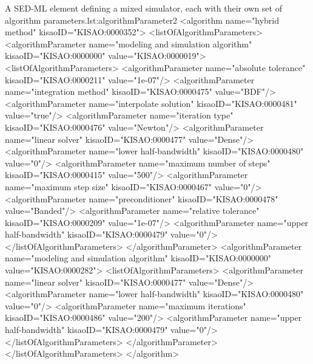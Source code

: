 \begin{myXmlLst}{A SED-ML  element defining a mixed simulator, each with their own set of algorithm parameters.}{lst:algorithmParameter2}
<algorithm name="hybrid method" kisaoID="KISAO:0000352">
    <listOfAlgorithmParameters>
        <algorithmParameter name="modeling and simulation algorithm" kisaoID="KISAO:0000000" value="KISAO:0000019">
            <listOfAlgorithmParameters>
                <algorithmParameter name="absolute tolerance"   kisaoID="KISAO:0000211" value="1e-07"/>
                <algorithmParameter name="integration method"   kisaoID="KISAO:0000475" value="BDF"/>
                <algorithmParameter name="interpolate solution" kisaoID="KISAO:0000481" value="true"/>
                <algorithmParameter name="iteration type"       kisaoID="KISAO:0000476" value="Newton"/>
                <algorithmParameter name="linear solver"        kisaoID="KISAO:0000477" value="Dense"/>
                <algorithmParameter name="lower half-bandwidth" kisaoID="KISAO:0000480" value="0"/>
                <algorithmParameter name="maximum number of steps" kisaoID="KISAO:0000415" value="500"/>
                <algorithmParameter name="maximum step size"    kisaoID="KISAO:0000467" value="0"/>
                <algorithmParameter name="preconditioner"       kisaoID="KISAO:0000478" value="Banded"/>
                <algorithmParameter name="relative tolerance"   kisaoID="KISAO:0000209" value="1e-07"/>
                <algorithmParameter name="upper half-bandwidth" kisaoID="KISAO:0000479" value="0"/>
            </listOfAlgorithmParameters>
        </algorithmParameter>
        <algorithmParameter name="modeling and simulation algorithm" kisaoID="KISAO:0000000" value="KISAO:0000282">
            <listOfAlgorithmParameters>
                <algorithmParameter name="linear solver"        kisaoID="KISAO:0000477" value="Dense"/>
                <algorithmParameter name="lower half-bandwidth" kisaoID="KISAO:0000480" value="0"/>
                <algorithmParameter name="maximum iterations"   kisaoID="KISAO:0000486" value="200"/>
                <algorithmParameter name="upper half-bandwidth" kisaoID="KISAO:0000479" value="0"/>
            </listOfAlgorithmParameters>
        </algorithmParameter>
    </listOfAlgorithmParameters>
</algorithm>
\end{myXmlLst}




